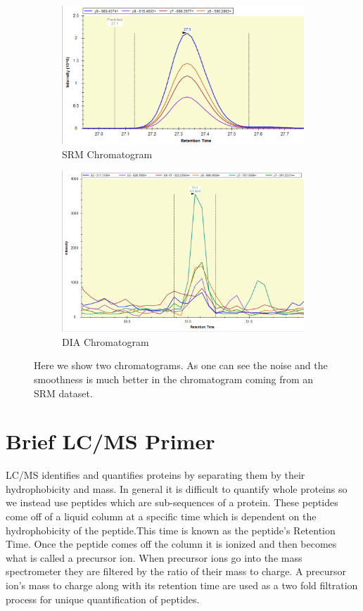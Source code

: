 \documentclass[12pt]{article}
\begin{document}
\begin{figure}
\centering
\begin{subfigure}{.5\textwidth}
  \centering
  \includegraphics[width=1\linewidth]{smoothExample.png}
  \caption{SRM Chromatogram}
  \label{fig:sub1}
\end{subfigure}%
\begin{subfigure}{.5\textwidth}
  \centering
  \includegraphics[width=1\linewidth]{DIA_example}
  \caption{DIA Chromatogram}
  \label{fig:sub2}
\end{subfigure}
\caption{Here we show two chromatograms. As one can see the noise and the smoothness is much better in the chromatogram coming from an SRM dataset.}
\label{fig:test}
\end{figure}

\section{Brief LC/MS Primer}
LC/MS identifies and quantifies proteins by separating them by their hydrophobicity and mass. In general it is difficult to quantify whole proteins so we instead use peptides which are sub-sequences of a protein. These peptides come off of a liquid column at a specific time which is dependent on the hydrophobicity of the peptide.This time is known as the peptide's Retention Time. Once the peptide comes off the column it is ionized and then becomes what is called a precursor ion. When precursor ions go into the mass spectrometer they are filtered by the ratio of their mass to charge. A precursor ion's mass to charge along with its retention time are used as a two fold filtration process for unique quantification of peptides. 
\end{document}
